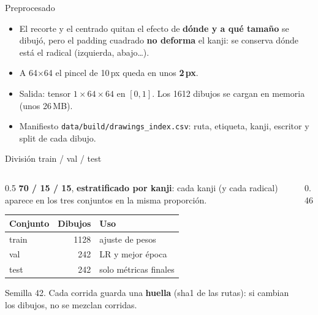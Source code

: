 \documentclass[aspectratio=169,11pt]{beamer}
\begin{document}
\begin{frame}{Preprocesado}
  \centering

  \bigskip
  \begin{itemize}
    \item El recorte y el centrado quitan el efecto de \textbf{dónde y a qué tamaño} se dibujó, pero el padding cuadrado \textbf{no deforma} el kanji: se conserva dónde está el radical (izquierda, abajo…).
    \item A 64×64 el pincel de 10\,px queda en unos \textbf{2\,px}.
    \item Salida: tensor $1\times64\times64$ en $[0,1]$. Los 1612 dibujos se cargan en memoria (unos 26\,MB).
    \item Manifiesto \texttt{data/build/drawings\_index.csv}: ruta, etiqueta, kanji, escritor y split de cada dibujo.
  \end{itemize}
\end{frame}

\begin{frame}{División train / val / test}
  \begin{columns}[T]
    \begin{column}{0.5\textwidth}
      \textbf{70 / 15 / 15}, \textbf{estratificado por kanji}: cada kanji (y cada radical) aparece en los tres conjuntos en la misma proporción.

      \medskip
      {\small
      \begin{tabular}{lrl}
        \toprule
        Conjunto & Dibujos & Uso \\
        \midrule
        train & 1128 & ajuste de pesos \\
        val   & 242  & LR y mejor época \\
        test  & 242  & solo métricas finales \\
        \bottomrule
      \end{tabular}}

      \medskip
      \small Semilla 42. Cada corrida guarda una \textbf{huella} (sha1 de las rutas): si cambian los dibujos, no se mezclan corridas.
    \end{column}
    \begin{column}{0.46\textwidth}
    \end{column}
  \end{columns}
\end{frame}
\end{document}
